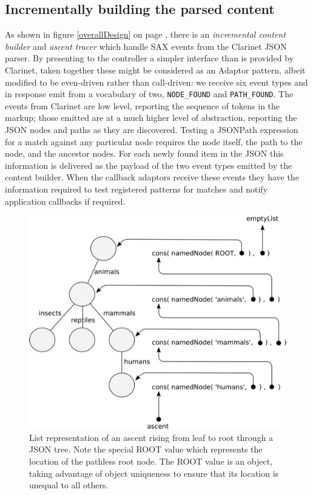 \documentclass[]{article}
\makeatletter
\def\maxwidth{\ifdim\Gin@nat@width>\linewidth\linewidth
\else\Gin@nat@width\fi}
\let\Oldincludegraphics\includegraphics
\renewcommand{\includegraphics}[1]{\Oldincludegraphics[width=\maxwidth]{#1}}
\makeatother
\begin{document}
\subsection{Incrementally building the parsed content}

As shown in figure \ref{overallDesign} on page \pageref{overallDesign},
there is an \emph{incremental content builder} and \emph{ascent tracer}
which handle SAX events from the Clarinet JSON parser. By presenting to
the controller a simpler interface than is provided by Clarinet, taken
together these might be considered as an Adaptor pattern, albeit
modified to be even-driven rather than call-driven: we receive six event
types and in response emit from a vocabulary of two,
\texttt{NODE\_FOUND} and \texttt{PATH\_FOUND}. The events from Clarinet
are low level, reporting the sequence of tokens in the markup; those
emitted are at a much higher level of abstraction, reporting the JSON
nodes and paths as they are discovered. Testing a JSONPath expression
for a match against any particular node requires the node itself, the
path to the node, and the ancestor nodes. For each newly found item in
the JSON this information is delivered as the payload of the two event
types emitted by the content builder. When the callback adaptors receive
these events they have the information required to test registered
patterns for matches and notify application callbacks if required.

\begin{figure}[htbp]
\centering
\includegraphics{images/ascent.png}
\caption{List representation of an ascent rising from leaf to root
through a JSON tree. Note the special ROOT value which represents the
location of the pathless root node. The ROOT value is an object, taking
advantage of object uniqueness to ensure that its location is unequal to
all others. \label{ascent}}
\end{figure}
\end{document}
